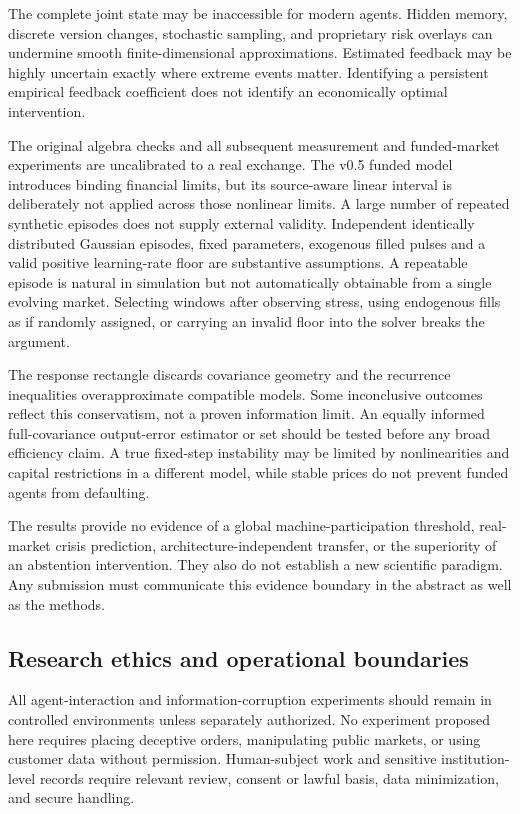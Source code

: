 \documentclass[11pt,a4paper]{article}
\theoremstyle{definition}
\theoremstyle{remark}
\begin{document}
The complete joint state may be inaccessible for modern agents. Hidden memory, discrete version changes, stochastic sampling, and proprietary risk overlays can undermine smooth finite-dimensional approximations. Estimated feedback may be highly uncertain exactly where extreme events matter. Identifying a persistent empirical feedback coefficient does not identify an economically optimal intervention.

The original algebra checks and all subsequent measurement and funded-market experiments are uncalibrated to a real exchange. The v0.5 funded model introduces binding financial limits, but its source-aware linear interval is deliberately not applied across those nonlinear limits. A large number of repeated synthetic episodes does not supply external validity. Independent identically distributed Gaussian episodes, fixed parameters, exogenous filled pulses and a valid positive learning-rate floor are substantive assumptions. A repeatable episode is natural in simulation but not automatically obtainable from a single evolving market. Selecting windows after observing stress, using endogenous fills as if randomly assigned, or carrying an invalid floor into the solver breaks the argument.

The response rectangle discards covariance geometry and the recurrence inequalities overapproximate compatible models. Some inconclusive outcomes reflect this conservatism, not a proven information limit. An equally informed full-covariance output-error estimator or set should be tested before any broad efficiency claim. A true fixed-step instability may be limited by nonlinearities and capital restrictions in a different model, while stable prices do not prevent funded agents from defaulting.

The results provide no evidence of a global machine-participation threshold, real-market crisis prediction, architecture-independent transfer, or the superiority of an abstention intervention. They also do not establish a new scientific paradigm. Any submission must communicate this evidence boundary in the abstract as well as the methods.

\subsection{Research ethics and operational boundaries}
All agent-interaction and information-corruption experiments should remain in controlled environments unless separately authorized. No experiment proposed here requires placing deceptive orders, manipulating public markets, or using customer data without permission. Human-subject work and sensitive institution-level records require relevant review, consent or lawful basis, data minimization, and secure handling.
\end{document}
